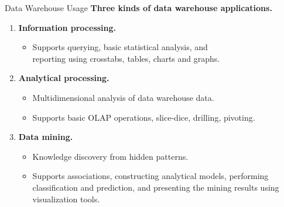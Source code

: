 \begin{frame}{Data Warehouse Usage}
	\textbf{Three kinds of data warehouse applications.}
	\begin{enumerate}
		\item \textbf{\color{airforceblue}Information processing.}
		      \begin{itemize}
			      \item Supports querying, basic statistical analysis, and \\ reporting using crosstabs, tables, charts and graphs.
		      \end{itemize}
		\item \textbf{\color{airforceblue}Analytical processing.}
		      \begin{itemize}
			      \item Multidimensional analysis of data warehouse data.
			      \item Supports basic OLAP operations, slice-dice, drilling, pivoting.
		      \end{itemize}
		\item \textbf{\color{airforceblue}Data mining.}
		      \begin{itemize}
			      \item Knowledge discovery from hidden patterns.
			      \item Supports associations, constructing analytical models, performing classification and prediction, and presenting the mining results using visualization tools.
		      \end{itemize}
	\end{enumerate}
\end{frame}



